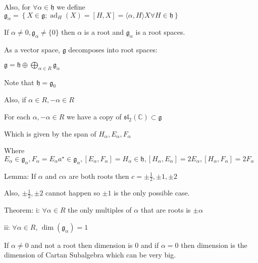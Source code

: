 \documentclass{article}
\theoremstyle{definition}
\begin{document}
Also, for \(\forall \alpha \in \mathfrak{h} \) we define \(\mathfrak{g}_\alpha =\left\{ X\in \mathfrak{g} ; \operatorname{ad}_H( X) = [H,X] = \langle \alpha ,H \rangle X \forall H\in \mathfrak{h}    \right\}  \) 

If \(\alpha \neq 0,\mathfrak{g}_\alpha \neq \{ 0 \}  \) then \(\alpha \) is a root and \(\mathfrak{g}_\alpha \) is a root spaces.

As a vector space, \(\mathfrak{g} \) decomposes into root spaces:

\(\mathfrak{g} = \mathfrak{h}\oplus \bigoplus_{\alpha \in R}^{} \mathfrak{g}_\alpha   \) 

Note that \(\mathfrak{h}=\mathfrak{g}_0  \) 

Also, if \(\alpha \in R,-\alpha \in R\) 

For each \(\alpha ,-\alpha \in R\) we have a copy of \(\mathfrak{sl}_2(\mathbb{C} )\subset \mathfrak{g}  \) 

Which is given by the span of \(H_\alpha ,E_\alpha ,F_\alpha \) 

Where \(E_\alpha \in \mathfrak{g}_\alpha , F_\alpha =E_\alpha a^{\star} \in \mathfrak{g}_\alpha , [E_\alpha ,F_\alpha ]=H_\alpha \in \mathfrak{h}, [H_\alpha ,E_\alpha ]=2E_\alpha , [H_\alpha ,F_\alpha ]=2F_\alpha    \) 

Lemma: If \(\alpha \) and \(c \alpha \) are both roots then \(c=\pm \frac{1}{2},\pm 1,\pm 2\) 

Also, \(\pm \frac{1}{2},\pm 2\) cannot happen so \(\pm 1\) is the only possible case.

Theorem: i: \(\forall \alpha \in R\) the only multiples of \(\alpha \) that are roots is \(\pm \alpha \) 

ii: \(\forall \alpha \in R\), \(\operatorname{\dim }(\mathfrak{g}_\alpha ) = 1 \)

If \(\alpha \neq 0\) and not a root then dimension is \(0\) and if \(\alpha = 0\) then dimension is the dimension of Cartan Subalgebra which can be very big.
\end{document}
